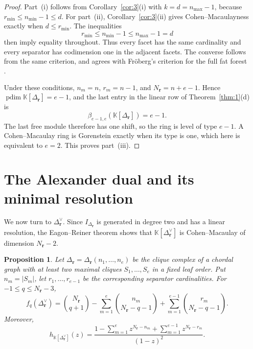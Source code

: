 \documentclass[11pt]{amsart}
\newtheorem{proposition}[theorem]{Proposition}
\theoremstyle{definition}
\theoremstyle{remark}
\newcommand{\K}{\mathbb K}
\newcommand{\SR}[1]{\K[#1]}
\DeclareMathOperator{\pdim}{pdim}
\begin{document}
	\begin{proof}
		Part~(i) follows from Corollary~\ref{cor:3}(i) with $k=d=n_{\max}-1$, because $r_{\min}\le n_{\min}-1\le d$. For part~(ii), Corollary~\ref{cor:3}(ii) gives Cohen--Macaulayness exactly when $d\le r_{\min}$. The inequalities
		\[
		r_{\min}\le n_{\min}-1\le n_{\max}-1=d
		\]
		then imply equality throughout. Thus every facet has the same cardinality and every separator has codimension one in the adjacent facets. The converse follows from the same criterion, and agrees with Fr\"oberg's criterion for the full fat forest \cite{Fr1}.
		
		Under these conditions, $n_m=n$, $r_m=n-1$, and $N_{\mathbf r}=n+e-1$. Hence $\pdim\SR{\Delta_{\mathbf r}}=e-1$, and the last entry in the linear row of Theorem~\ref{thm:1}(d) is
		\[
		\beta_{e-1,e}(\SR{\Delta_{\mathbf r}})=e-1.
		\]
		The last free module therefore has one shift, so the ring is level of type $e-1$. A Cohen--Macaulay ring is Gorenstein exactly when its type is one, which here is equivalent to $e=2$. This proves part~(iii).
	\end{proof}
	
	\section{The Alexander dual and its minimal resolution}\label{sec:5}
	
	We now turn to $\Delta_{\mathbf r}^\vee$. Since $I_{\Delta_{\mathbf r}}$ is generated in degree two and has a linear resolution, the Eagon--Reiner theorem shows that $\SR{\Delta_{\mathbf r}^\vee}$ is Cohen--Macaulay of dimension $N_{\mathbf r}-2$.
	
	\begin{proposition}\label{prop:3}
		Let $\Delta_{\mathbf r}=\Delta_{\mathbf r}(n_1,\ldots,n_e)$ be the clique complex of a chordal graph with at least two maximal cliques $S_1,\ldots,S_e$ in a fixed leaf order. Put $n_m=|S_m|$, let $r_1,\ldots,r_{e-1}$ be the corresponding separator cardinalities.
		For $-1\le q\le N_{\mathbf r}-3$,
		\[
		f_q(\Delta_{\mathbf r}^\vee)
		=
		\binom{N_{\mathbf r}}{q+1}
		-
		\sum_{m=1}^e\binom{n_m}{N_{\mathbf r}-q-1}
		+
		\sum_{m=1}^{e-1}\binom{r_m}{N_{\mathbf r}-q-1}.
		\]
		Moreover,
		\[
		h_{\SR{\Delta_{\mathbf r}^\vee}}(z)
		=
		\frac{
			1-\sum_{m=1}^e z^{N_{\mathbf r}-n_m}
			+\sum_{m=1}^{e-1}z^{N_{\mathbf r}-r_m}
		}{(1-z)^2}.
		\]
	\end{proposition}
	
\end{document}
